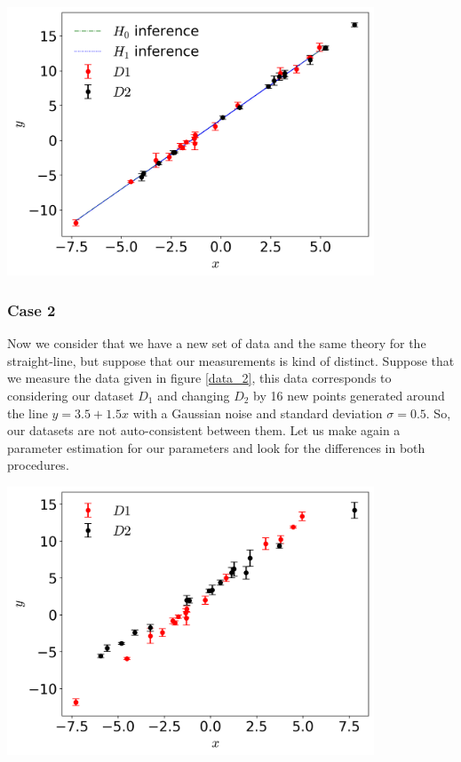 \documentclass[onecolumn,           %
               showpacs,            %
               preprintnumbers,     %
               aps,                 %
               prl,          	    %
               letterpaper,             %
               superscriptaddress,      %
               nofootinbib,         %
               tightenlines,        %
               floats,floatfix      %
               ,usenatbib,
               ]{revtex4-1}
\begin{document}
\begin{minipage}{\textwidth}
\centering
\includegraphics[height=8cm]{Figures/stright1.png}
\label{stright1}
\end{minipage}

\subsubsection{Case 2}

Now we consider that we have a new set of data and the same theory for the straight-line, but suppose that our measurements is kind of distinct. Suppose that we measure the data given in  figure \ref{data_2}, this data corresponds to considering our dataset $D_1$ and changing $D_2$ by 16 new points generated around the line $y=3.5+1.5x$ with a Gaussian noise and standard deviation $\sigma = 0.5$. So, our datasets are not auto-consistent between them. Let us make again a parameter estimation for our parameters and look for the differences in both procedures.

\begin{minipage}{\textwidth}
\centering
\includegraphics[height=8cm]{Figures/data_2.png}
\label{data_2}
\end{minipage}\\ $ $
\end{document}
